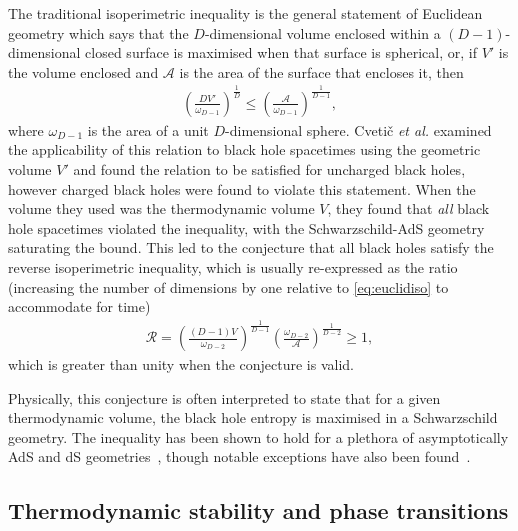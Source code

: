 \documentclass[
twoside,
openright,
frontopenright,
]{dmathesis}
\begin{document}
The traditional isoperimetric inequality is the general statement of Euclidean
geometry which says that the $D$-dimensional volume enclosed within a
$(D-1)$-dimensional closed surface is maximised when that surface is spherical,
or, if $V'$ is the volume enclosed and $\mathcal{A}$ is the area of
the surface that encloses it, then
\begin{align}\label{eq:euclidiso}
\left(\frac{D V'}{\omega_{D-1}}\right)^{\frac{1}{D}} \leqslant
  \left(\frac{\mathcal{A}}{\omega_{D-1}}\right)^{\frac{1}{D-1}},
\end{align}
where $\omega_{D-1}$ is the area of a unit $D$-dimensional sphere. Cveti\v c
\emph{et al.} examined the applicability of this relation to black hole
spacetimes using the geometric volume $V'$ and found the relation to be
satisfied for uncharged black holes, however charged black holes were found to
violate this statement. When the volume they used was the thermodynamic volume
$V$, they found that \emph{all} black hole spacetimes violated the inequality,
with the Schwarzschild-AdS geometry saturating the bound. This led to the
conjecture that all black holes satisfy the reverse isoperimetric inequality,
which is usually re-expressed as the ratio (increasing the number of dimensions
by one relative to \cref{eq:euclidiso} to accommodate for time)
\begin{align}
  \mathcal{R} =
  \left(\frac{(D-1)V}{\omega_{D-2}}\right)^{\frac{1}{D-1}}
  \left(\frac{\omega_{D-2}}{\mathcal{A}}\right)^{\frac{1}{D-2}} 
  \geqslant 1,
\end{align}
which is greater than unity when the conjecture is valid.

Physically, this conjecture is often interpreted to state that for a given
thermodynamic volume, the black hole entropy is maximised in a Schwarzschild
geometry. The inequality has been shown to hold for a plethora of asymptotically
AdS and dS geometries~\cite{Cvetic:2010jb,Dolan:2013ft}, though notable
exceptions have also been
found~\cite{Hennigar:2014cfa,Hennigar:2015cja,Brenna:2015pqa}.

\subsection{Thermodynamic stability and phase transitions}
\label{sec:hawkingpage}
\end{document}
